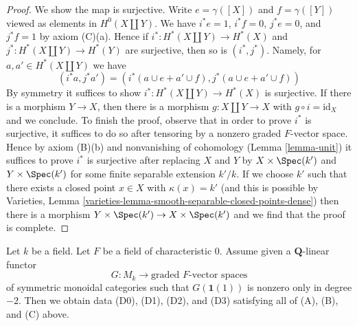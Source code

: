 \begin{proof}
\medskip\noindent
We show the map is surjective. Write $e = \gamma([X])$ and $f = \gamma([Y])$
viewed as elements in $H^0(X \amalg Y)$. We have
$i^*e = 1$, $i^*f = 0$, $j^*e = 0$, and $j^*f = 1$ by axiom (C)(a).
Hence if $i^* : H^*(X \amalg Y) \to  H^*(X)$
and $j^* : H^*(X \amalg Y) \to H^*(Y)$ are surjective, then
so is $(i^*, j^*)$. Namely, for $a, a' \in H^*(X \amalg Y)$
we have
$$
(i^*a, j^*a') = (i^*(a \cup e + a' \cup f), j^*(a \cup e + a' \cup f))
$$
By symmetry it suffices to show $i^* : H^*(X \amalg Y) \to  H^*(X)$
is surjective. If there is a morphism $Y \to X$, then there is a morphism
$g : X \amalg Y \to X$ with $g \circ i = \text{id}_X$ and we conclude.
To finish the proof, observe that in order to prove
$i^*$ is surjective, it suffices to do so after tensoring
by a nonzero graded $F$-vector space. Hence by axiom (B)(b)
and nonvanishing of cohomology (Lemma \ref{lemma-unit})
it suffices to prove $i^*$ is surjective after replacing
$X$ and $Y$ by $X \times \Spec(k')$ and $Y \times \Spec(k')$
for some finite separable extension $k'/k$.
If we choose $k'$ such that there exists a closed point
$x \in X$ with $\kappa(x) = k'$ (and this is possible by
Varieties, Lemma \ref{varieties-lemma-smooth-separable-closed-points-dense})
then there is a morphism $Y \times \Spec(k') \to X \times \Spec(k')$
and we find that the proof is complete.
\end{proof}

\begin{lemma}
\label{lemma-from-functor-to-weil}
Let $k$ be a field. Let $F$ be a field of characteristic $0$.
Assume given a $\mathbf{Q}$-linear functor
$$
G : M_k \longrightarrow \text{graded }F\text{-vector spaces}
$$
of symmetric monoidal categories such that $G(\mathbf{1}(1))$
is nonzero only in degree $-2$. Then we obtain data (D0), (D1), (D2), and (D3)
satisfying all of (A), (B), and (C) above.
\end{lemma}

